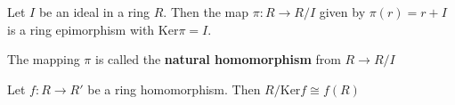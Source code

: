 \begin{theorem}
    Let $I$ be an ideal in a ring $R$. Then the map $\pi : R \to R/I$ given by $\pi(r) = r + I$ is a ring epimorphism with Ker$\pi = I$.
\end{theorem}

\begin{remark}
    The mapping $\pi$ is called the \textbf{natural homomorphism} from $R \to R/I$
\end{remark}

\begin{theorem}
    Let $f : R \to R'$  be a ring homomorphism. Then $R/\text{Ker}f \cong f(R)$
\end{theorem}